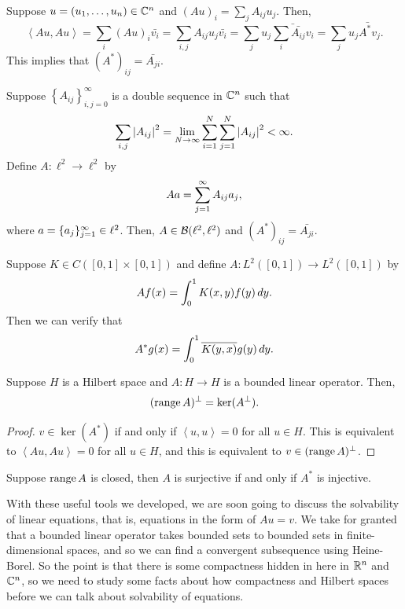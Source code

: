 \documentclass[a4paper]{article}
\renewcommand{\braket}[2]{\left\langle #1, #1 \right\rangle}
\begin{document}
\begin{eg}
  Suppose $u = (u_1, \dots, u_n) \in \mathbb{C}^n$
  and $(A u)_i = \sum_j A_{ij} u_j$.
  Then,
  \[
    \braket{A u}{v} = \sum_i (A u)_i \bar{v_i}
    = \sum_{i, j} A_{ij} u_j \bar{v_i}
    = \sum_j u_j \bar{\sum_i \bar{A_{ij}} v_i}
    = \sum_j u_j \bar{A^* v}_j.
  \]
  This implies that $(A^*)_{ij} = \bar{A_{ji}}$.
\end{eg}

\begin{eg}
  Suppose $\left\{ A_{ij} \right\}_{i, j = 0}^\infty$
  is a double sequence in $\mathbb{C}^n$ such that
  \[
    \sum_{i, j} \left\lvert A_{ij}\right\rvert^2 = \lim_{N \to \infty}
    \sum_{i=1}^N \sum_{j=1}^N \left\lvert A_{ij}\right\rvert^2 < \infty.
  \]
  Define $A : \ell^2 \to \ell^2$ by
  \[
    A a = \sum_{j=1}^\infty A_{ij} a_j,
  \]
  where $a = \{ a_j \}_{j=1}^\infty \in \ell^2$. Then,
  $A \in \mathcal{B}(\ell^2, \ell^2)$ and
  $(A^*)_{ij} = \bar{A_{ji}}$.
\end{eg}

\begin{eg}
  Suppose $K \in C([0, 1] \times [0, 1])$ and define
  $A : L^2 ([0, 1]) \to L^2 ([0, 1])$ by
  \[
    A f(x) = \int_0^1 K(x, y) f(y) \, d y.
  \]
  Then we can verify that
  \[
    A^* g(x) = \int_0^1 \overline{K(y, x)} g(y) \, d y.
  \]
\end{eg}

\begin{thm}
  Suppose $H$ is a Hilbert space and $A : H \to H$
  is a bounded linear operator. Then,
  \[
    (\operatorname{range} A)^\perp = \ker (A^\perp).
  \]
\end{thm}

\begin{proof}
  $v \in \ker (A^*)$ if and only if $\braket{u}{A^* v} = 0$
  for all $u \in H$. This is equivalent to
  $\braket{A u}{v} = 0$ for all $u \in H$, and
  this is equivalent to $v \in (\operatorname{range} A)^\perp$.
\end{proof}

\begin{cor}
  Suppose $\operatorname{range} A$ is closed, then
  $A$ is surjective if and only if
  $A^*$ is injective.
\end{cor}

With these useful tools we developed,
we are soon going to discuss the solvability of linear
equations, that is, equations in the form of $Au = v$.
We take for granted that a bounded linear operator takes
bounded sets to bounded sets in finite-dimensional spaces,
and so we can find a convergent subsequence using Heine-Borel.
So the point is that there is some compactness hidden in
here in $\mathbb{R}^n$ and $\mathbb{C}^n$, so we need to study some facts
about how compactness and Hilbert spaces before we can talk
about solvability of equations.
\end{document}
